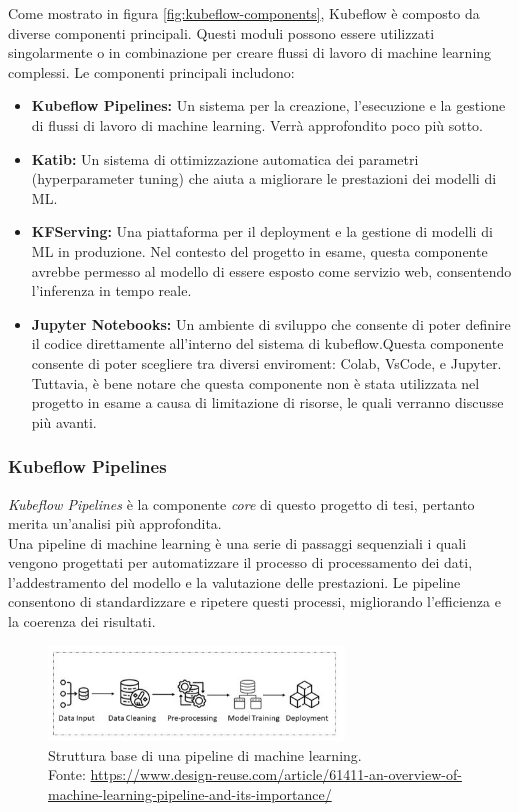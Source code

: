 Come mostrato in figura \ref{fig:kubeflow-components}, Kubeflow è composto da diverse
componenti principali. Questi moduli possono essere utilizzati singolarmente o in combinazione
per creare flussi di lavoro di machine learning complessi. Le componenti principali includono:
\begin{itemize}
    \item \textbf{Kubeflow Pipelines:} Un sistema per la creazione, l'esecuzione e la gestione
    di flussi di lavoro di machine learning. Verrà approfondito poco più sotto.
    \item \textbf{Katib:} Un sistema di ottimizzazione automatica dei parametri (hyperparameter tuning)
    che aiuta a migliorare le prestazioni dei modelli di ML.\@
    \item \textbf{KFServing:} Una piattaforma per il deployment e la gestione di modelli di ML
    in produzione. Nel contesto del progetto in esame, questa componente avrebbe permesso al modello
    di essere esposto come servizio web, consentendo l'inferenza in tempo reale.
    \item \textbf{Jupyter Notebooks:} Un ambiente di sviluppo che consente di poter definire il codice
    direttamente all'interno del sistema di kubeflow.Questa componente consente di poter scegliere tra diversi
    enviroment: Colab, VsCode, e Jupyter. Tuttavia, è bene notare che questa componente
    non è stata utilizzata nel progetto in esame a causa di limitazione di risorse, le quali verranno
    discusse più avanti.
\end{itemize}


\subsubsection{Kubeflow Pipelines}
\textit{Kubeflow Pipelines} è la componente \textit{core} di questo progetto di tesi, 
pertanto merita un'analisi più approfondita.\\

Una pipeline di machine learning è una serie di passaggi sequenziali i quali vengono
progettati per automatizzare il processo di processamento dei dati, l'addestramento del modello
e la valutazione delle prestazioni. Le pipeline consentono di standardizzare e ripetere
questi processi, migliorando l'efficienza e la coerenza dei risultati.

\begin{figure}[H]
    \centering
    \includegraphics[width=0.7\textwidth]{images/overview-ml-pipeline-structure.jpg}
        \caption{Struttura base di una pipeline di machine learning.\\
        Fonte: \url{https://www.design-reuse.com/article/61411-an-overview-of-machine-learning-pipeline-and-its-importance/}}
    \label{fig:ml-pipeline-structure}
\end{figure}

